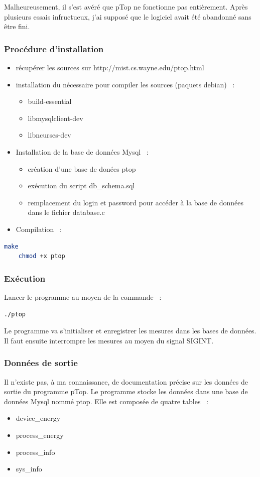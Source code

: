 \documentclass[a4paper, 11pt]{report}
\begin{document}
Malheureusement, il s'est avéré que pTop ne fonctionne pas entièrement. Après plusieurs essais infructueux, j'ai supposé que le logiciel avait été abandonné sans être fini.

			\subsubsection{Procédure d'installation}
\begin{itemize}
    \item récupérer les sources sur http://mist.cs.wayne.edu/ptop.html
    \item installation du nécessaire pour compiler les sources (paquets debian) ~:
    \begin{itemize}
	\item build-essential
	\item libmysqlclient-dev
	\item libncurses-dev
    \end{itemize}
    \item Installation de la base de données Mysql ~:
    \begin{itemize}
	\item création d’une base de donées ptop
	\item exécution du script db\_schema.sql
	\item remplacement du login et password pour accéder à la base de données dans le fichier database.c
    \end{itemize}
    \item Compilation ~:
\end{itemize}

\begin{lstlisting}[language=bash]
	make
	chmod +x ptop
\end{lstlisting}

			\subsubsection{Exécution}
Lancer le programme au moyen de la commande ~:

\begin{lstlisting}[language=bash]
	./ptop
\end{lstlisting}

Le programme va s'initialiser et enregistrer les mesures dans les bases de données. Il faut ensuite interrompre les mesures au moyen du signal SIGINT.

			\subsubsection{Données de sortie}
Il n’existe pas, à ma connaissance, de documentation précise sur les données de sortie du programme pTop.  Le programme stocke les données dans une base de données Mysql nommé ptop. Elle est composée de quatre tables ~:
\begin{itemize}
	\item device\_energy
	\item process\_energy
	\item process\_info
	\item sys\_info
\end{itemize}
\end{document}
